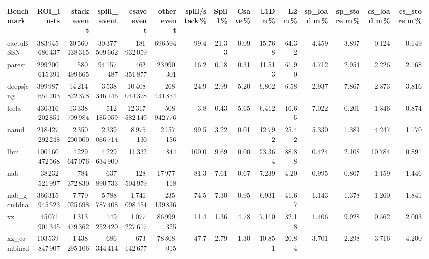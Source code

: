 \documentclass[9pt,landscape,a4paper]{article}
\begin{document}
\vspace{2mm}
\centering
\begin{adjustbox}{max width=\textwidth, max totalheight=0.50\textheight}%
\begin{tabular}{lrrrrrrrrrrrrrr}
\toprule
Benchmark & ROI\_insts & stack\_event & \textbf{spill\_event} & csave\_event & other\_event & spill/stack\,\% & Spill\,\% & Csave\,\% & L1D m\,\% & L2 m\,\% & sp\_load m\,\% & sp\_store m\,\% & cs\_load m\,\% & cs\_store m\,\% \\
\midrule
cactuBSSN & 383\,945\,680\,437 & 30\,560\,138\,315 & 30\,377\,509\,662 & 181\,932\,059 & 696\,594 & 99.4 & 21.33 & 0.09 & 15.768 & 64.32 & 4.459 & 3.897 & 0.124 & 0.149 \\
parest & 299\,200\,615\,391 & 580\,499\,665 & 94\,157\,487 & 462\,351\,877 & 23\,990\,301 & 16.2 & 0.18 & 0.31 & 11.513 & 61.90 & 4.712 & 2.954 & 2.226 & 2.168 \\
deepsjeng & 399\,987\,651\,203 & 14\,214\,822\,378 & 3\,538\,346\,146 & 10\,408\,044\,378 & 268\,431\,854 & 24.9 & 2.99 & 5.20 & 9.802 & 6.58 & 2.937 & 7.867 & 2.873 & 3.816 \\
leela & 436\,316\,202\,851 & 13\,338\,709\,984 & 512\,185\,059 & 12\,317\,582\,149 & 508\,942\,776 & 3.8 & 0.43 & 5.65 & 6.412 & 16.65 & 7.022 & 0.201 & 1.846 & 0.874 \\
namd & 218\,427\,292\,248 & 2\,350\,200\,000 & 2\,339\,066\,714 & 8\,976\,130 & 2\,157\,156 & 99.5 & 3.22 & 0.01 & 12.792 & 25.42 & 5.330 & 1.389 & 4.247 & 1.170 \\
lbm & 100\,160\,472\,568 & 4\,229\,647\,076 & 4\,229\,634\,900 & 11\,332 & 844 & 100.0 & 9.69 & 0.00 & 23.364 & 88.88 & 0.424 & 2.108 & 10.784 & 0.891 \\
nab & 38\,232\,521\,997 & 784\,372\,830 & 637\,890\,733 & 128\,504\,979 & 17\,977\,118 & 81.3 & 7.61 & 0.67 & 7.239 & 4.20 & 0.995 & 0.807 & 1.159 & 1.446 \\
nab\_gcn4dna & 366\,315\,945\,523 & 7\,770\,025\,698 & 5\,788\,787\,408 & 1\,746\,098\,454 & 235\,139\,836 & 74.5 & 7.30 & 0.95 & 6.931 & 41.67 & 1.143 & 1.378 & 1.260 & 1.841 \\
xz & 45\,071\,901\,345 & 1\,313\,479\,362 & 149\,252\,420 & 1\,077\,227\,617 & 86\,999\,325 & 11.4 & 1.36 & 4.78 & 7.110 & 32.18 & 1.406 & 9.928 & 0.562 & 2.003 \\
xz\_combined & 103\,539\,847\,907 & 1\,438\,295\,106 & 686\,344\,414 & 673\,142\,677 & 78\,808\,015 & 47.7 & 2.79 & 1.30 & 10.851 & 20.84 & 3.701 & 2.298 & 3.716 & 4.200 \\

\end{tabular}
\end{adjustbox}
\end{document}
